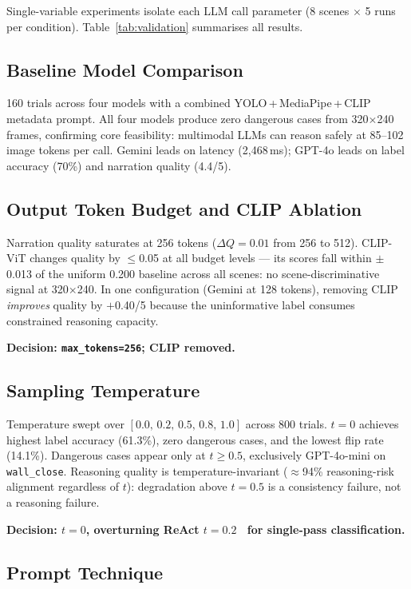 \documentclass[journal]{IEEEtran}
\begin{document}
Single-variable experiments isolate each LLM call parameter
(8 scenes $\times$ 5 runs per condition).
Table~\ref{tab:validation} summarises all results.

\subsection{Baseline Model Comparison}

160 trials across four models with a combined
YOLO\,+\,MediaPipe\,+\,CLIP metadata prompt.
All four models produce zero dangerous cases from 320$\times$240
frames, confirming core feasibility: multimodal LLMs can reason
safely at 85--102 image tokens per call.
Gemini leads on latency (2,468\,ms); GPT-4o leads on label
accuracy (70\%) and narration quality (4.4/5).

\subsection{Output Token Budget and CLIP Ablation}

Narration quality saturates at 256 tokens ($\Delta Q\!=\!0.01$
from 256 to 512).
CLIP-ViT changes quality by $\leq$0.05 at all budget levels ---
its scores fall within $\pm$0.013 of the uniform 0.200 baseline
across all scenes: no scene-discriminative signal at 320$\times$240.
In one configuration (Gemini at 128 tokens), removing CLIP
\emph{improves} quality by $+$0.40/5 because the uninformative
label consumes constrained reasoning capacity.

\textbf{Decision: \texttt{max\_tokens=256}; CLIP removed.}

\subsection{Sampling Temperature}
\label{sec:temp}

Temperature swept over $[0.0,\,0.2,\,0.5,\,0.8,\,1.0]$ across
800 trials.
$t=0$ achieves highest label accuracy (61.3\%), zero dangerous
cases, and the lowest flip rate (14.1\%).
Dangerous cases appear only at $t\!\geq\!0.5$, exclusively
GPT-4o-mini on \texttt{wall\_close}.
Reasoning quality is temperature-invariant ($\approx$94\%
reasoning-risk alignment regardless of $t$): degradation above
$t=0.5$ is a consistency failure, not a reasoning failure.

\textbf{Decision: $t=0$, overturning ReAct
$t=0.2$~\cite{yao2022react} for single-pass classification.}

\subsection{Prompt Technique}
\end{document}
